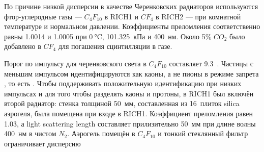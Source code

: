 
По причине низкой дисперсии в качестве Черенковских радиаторов используются фтор-углеродные газы --- $C_{4}F_{10}$ в RICH1 и $CF_{4}$ в RICH2 --- при комнатной температуре и нормальном давлении. Коэффициенты преломления соответственно равны 1.0014 и 1.0005 при $\SI{0}{\degreeCelsius}$, 101.325~кПа и 400~нм. Около 5\% $CO_{2}$ было добавлено в $CF_{4}$ для погашения сцинтилляции в газе.


Порог по импульсу для черенковского света в $C_{4}F_{10}$ составляет 9.3~\GeVoverC. Частицы с меньшим импульсом идентифицируются как каоны, а не пионы в режиме запрета \todo, то есть \todo.
Чтобы поддерживать положительную идентификацию при низких импульсах и для того чтобы разделять каоны и протоны, в RICH1 был включён второй радиатор: стенка толщиной 50~мм, составленная из 16~плиток silica аэрогеля, была помещена при входе в RICH1. Коэффициент преломления равен 1.03, а light scattering length \todo составляет прилизительно 50~мм при длине волны 400~нм в чистом $N_2$. Аэрогель помещён в $C_{4}F_{10}$ \todo и тонкий стеклянный фильтр ограничивает дисперсию \todo


